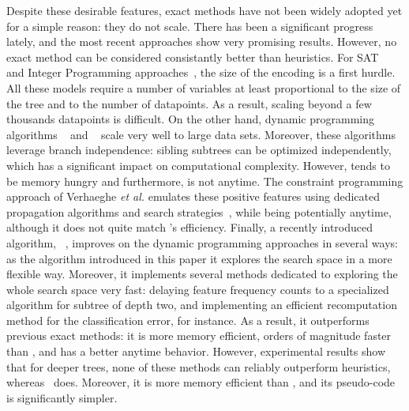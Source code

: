 \documentclass{article}
\begin{document}
Despite these desirable features, exact methods have not been widely adopted yet for a simple reason: they do not scale. There has been a significant progress lately, and the most recent approaches show very promising results. However, no exact method can be considered consistantly better than heuristics. 
For SAT~\cite{avellanedaefficient,narodytska2018learning} and Integer Programming approaches~\cite{aghaei2020learning,bertsimas2017optimal,bertsimas2007classification,verwer2019learning}, the size of the encoding is a first hurdle. All these models require a number of variables at least proportional to the size of the tree and to the number of datapoints. As a result, scaling beyond a few thousands datapoints is difficult. 
On the other hand, dynamic programming algorithms \olddleight~\cite{dl8} and \dleight~\cite{dl85} scale very well to large data sets. Moreover, these algorithms leverage branch independence: sibling subtrees can be optimized independently, which has a significant impact on computational complexity. However, \dleight tends to be memory hungry and furthermore, is not anytime.
The constraint programming approach of Verhaeghe \textit{et al.} emulates these positive features using dedicated propagation algorithms and search strategies~\cite{verhaeghe2019learning}, while being potentially anytime, although it does not quite match \dleight's efficiency.
Finally, a recently introduced algorithm, \murtree~\cite{DBLP:journals/corr/abs-2007-12652}, improves on the dynamic programming approaches in several ways: as the algorithm introduced in this paper it explores the search space in a more flexible way. Moreover, it implements several methods dedicated to exploring the whole search space very fast: delaying feature frequency counts to a specialized algorithm for subtree of depth two, and implementing an efficient recomputation method for the classification error, for instance.
As a result, it outperforms previous exact methods: it is more memory efficient, orders of magnitude faster than \dleight, and has a better anytime behavior. However, experimental results show that for deeper trees, none of these methods can reliably outperform heuristics, whereas \budalg\ does. Moreover, it is more memory efficient than \murtree, and its pseudo-code is significantly simpler.
 

%
\end{document}
